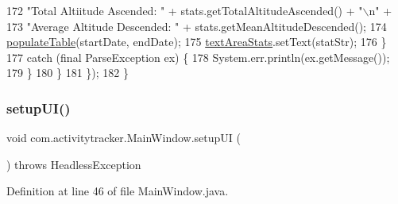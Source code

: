 \begin{DoxyCode}
172                             \textcolor{stringliteral}{"Total Altiitude Ascended: "} + stats.getTotalAltitudeAscended() + \textcolor{stringliteral}{"\(\backslash\)n"} +
173                             \textcolor{stringliteral}{"Average Altitude Descended: "} + stats.getMeanAltitudeDescended();
174                     \mbox{\hyperlink{classcom_1_1activitytracker_1_1_main_window_ae3955dd50087d95257d029b9c67ac185}{populateTable}}(startDate, endDate);
175                     \mbox{\hyperlink{classcom_1_1activitytracker_1_1_main_window_ac8e2aa82f079b11dbdc5bcf2e81d2324}{textAreaStats}}.setText(statStr);
176                 \}
177                 \textcolor{keywordflow}{catch} (\textcolor{keyword}{final} ParseException ex) \{
178                     System.err.println(ex.getMessage());
179                 \}
180             \}
181         \});
182     \}
\end{DoxyCode}
\mbox{\label{classcom_1_1activitytracker_1_1_main_window_a53a019623a37b950473359fc625b6423}} 
\subsubsection{\texorpdfstring{setup\+U\+I()}{setupUI()}}
{\footnotesize\ttfamily void com.\+activitytracker.\+Main\+Window.\+setup\+UI (\begin{DoxyParamCaption}{ }\end{DoxyParamCaption}) throws Headless\+Exception\hspace{0.3cm}{\ttfamily [private]}}



Definition at line 46 of file Main\+Window.\+java.


